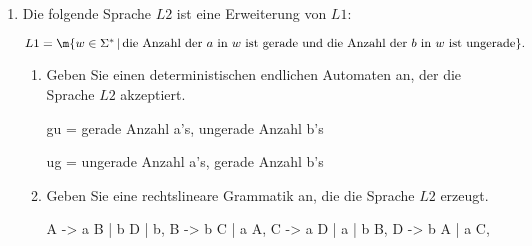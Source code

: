 \documentclass{bschlangaul-aufgabe}
\begin{document}
\begin{enumerate}
\begin{enumerate}

\item Geben Sie einen regulären Ausdruck an, der die Sprache $L1$
beschreibt.

\begin{bAntwort}
(aa)*(b|aba)(aa)*
\end{bAntwort}
\end{enumerate}

\item Die folgende Sprache $L2$ ist eine Erweiterung von $L1$:

$L1 = \m{w \in \Sigma^* \, | \, \text{die Anzahl der } a \text{ in } w \text{ ist gerade und die Anzahl der } b \text{ in } w \text{ ist ungerade}}.$

\begin{enumerate}
\item Geben Sie einen deterministischen endlichen Automaten an, der die
Sprache $L2$ akzeptiert.

\begin{bAntwort}

gu = gerade Anzahl a’s, ungerade Anzahl b’s

ug = ungerade Anzahl a’s, gerade Anzahl b’s

\begin{center}
\end{center}

\end{bAntwort}


\item Geben Sie eine rechtslineare Grammatik an, die die Sprache $L2$
erzeugt.

\begin{bAntwort}
\begin{bProduktionsRegeln}
A -> a B | b D | b,
B -> b C | a A,
C -> a D | a | b B,
D -> b A | a C,
\end{bProduktionsRegeln}
\end{bAntwort}

\end{enumerate}
\end{enumerate}
\end{document}

